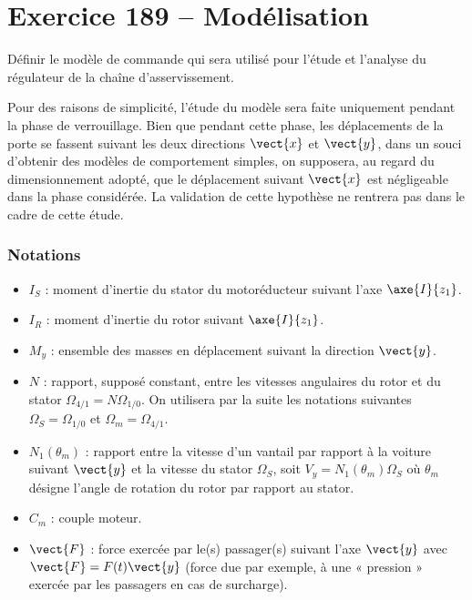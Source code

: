 \section*{Exercice 189 -- Modélisation}
\setcounter{exo}{0}


\begin{obj}
Définir le modèle de commande qui sera utilisé pour l’étude et l’analyse
du régulateur de la chaîne d’asservissement.
\end{obj}


Pour des raisons de simplicité, l’étude du modèle sera faite uniquement pendant
la phase de verrouillage. Bien que pendant cette phase, les déplacements de la
porte se fassent suivant les deux directions $\vect{x}$ et $\vect{y}$, dans un souci d’obtenir des
modèles de comportement simples, on supposera, au regard du dimensionnement
adopté, que le déplacement suivant $\vect{x}$ est négligeable dans la phase considérée.
La validation de cette hypothèse ne rentrera pas dans le cadre de cette
étude.



\subsubsection*{Notations}
\begin{itemize}
\item $I_S$ : moment d’inertie du stator du motoréducteur suivant l’axe $\axe{I}{z_1}$.
\item $I_R$ : moment d’inertie du rotor suivant $\axe{I}{z_1}$.
\item $M_y$ : ensemble des masses en déplacement suivant la direction $\vect{y}$.
\item $N$ : rapport, supposé constant, entre les vitesses angulaires du rotor et du stator $\Omega_{4/1}=N\Omega_{1/0}$. On utilisera par la suite les notations suivantes $\Omega_S=\Omega_{1/0}$ et $\Omega_m = \Omega_{4/1}$.
\item $N_1\left(\theta_m\right)$ : rapport entre la vitesse d’un vantail par rapport à la voiture suivant $\vect{y}$ et la vitesse du stator $\Omega_S$, soit $V_y=N_1\left(\theta_m\right)\Omega_S$ où $\theta_m$ désigne l’angle de rotation
du rotor par rapport au stator.
\item $C_m$ : couple moteur.
\item $\vect{F}$ : force exercée par le(s) passager(s) suivant l’axe $\vect{y}$ avec $\vect{F}=F(t)\vect{y} $  (force due
par exemple, à une « pression » exercée par les passagers en cas de surcharge).
\end{itemize}


